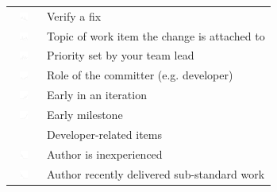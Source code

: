 \documentclass[12pt,oneside]{book}
\begin{document}
\begin{table}[t!]
\begin{tabular}{ll}
\vspace{-2pt}\includegraphics[height=10px, width=30px]{figures/sparkles/you-need-to-verify-a-fix.pdf} & Verify a fix\\
\vspace{-2pt}\includegraphics[height=10px, width=30px]{figures/sparkles/topic-of-work-item-the-change-is-attached-to.pdf} & Topic of work item the change is attached to\\ 
\vspace{-2pt}\includegraphics[height=10px, width=30px]{figures/sparkles/priority-of-related-work-item-was-set-from-your-team-lead.pdf} & Priority set by your team lead\\
\vspace{-2pt}\includegraphics[height=10px, width=30px]{figures/sparkles/role-of-committer--e-g--developer--team-lead--intern.pdf} & Role of the committer (e.g. developer)\\
\vspace{-2pt}\includegraphics[height=10px, width=30px]{figures/sparkles/early-in-an-iteration.pdf} & Early in an iteration\\
\vspace{-2pt}\includegraphics[height=10px, width=30px]{figures/sparkles/early-milestone.pdf} & Early milestone\\
\midrule
\vspace{-2pt}& Developer-related items\\
\midrule
\vspace{-2pt}\includegraphics[height=10px, width=30px]{figures/sparkles/change-author-is-inexperienced.pdf} & Author is inexperienced\\
\vspace{-2pt}\includegraphics[height=10px, width=30px]{figures/sparkles/recent-work-of-low-quality.pdf} & Author recently delivered sub-standard work\\

\end{tabular}
\end{table}
\end{document}
